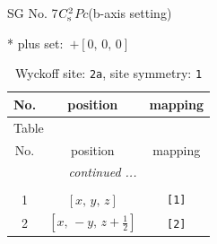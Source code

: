 \documentclass[fleqn,8pt]{jsarticle}
\begin{document}
\setcounter{MaxMatrixCols}{32}

\renewcommand{\tablename}{Table~}
\renewcommand{\figurename}{Figure~}
\begin{center}
\LARGE
SG No. 7\quad$C_{\rm s}^{2}$\quad$Pc$\quad(b-axis setting)\quad[ monoclinic ]
\end{center}
* plus set:\,\,\,$+\left[ 0,\, 0,\, 0 \right]$
\renewcommand{\arraystretch}{1.2}
\begin{longtable}{ccc}
\caption{Wyckoff site: {\tt 2a}, site symmetry: {\tt 1}}
 \\
 \hline \hline
No. & position & mapping \\ \hline \endfirsthead

\multicolumn{2}{l}{\tablename\ \thetable{}} \\
 \hline \hline
No. & position & mapping \\ \hline \endhead

 \hline \hline
\multicolumn{2}{r}{\footnotesize\it continued ...} \\ \endfoot

 \hline \hline
\multicolumn{2}{r}{} \\ \endlastfoot

1 & $\left[ x,\, y,\, z \right]$ & {\tt [1]} \\ \hline
2 & $\left[ x,\, - y,\, z + \frac{1}{2} \right]$ & {\tt [2]} \\
\end{longtable}
\end{document}
